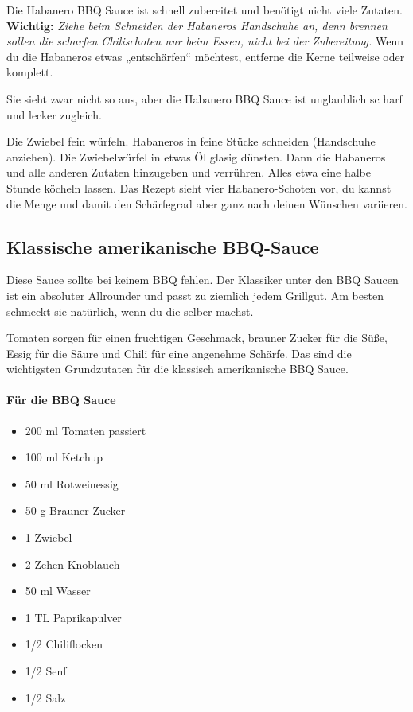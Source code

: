 Die Habanero BBQ Sauce ist schnell zubereitet und benötigt nicht viele Zutaten.
\textbf{Wichtig:} \emph{Ziehe beim Schneiden der Habaneros Handschuhe an, 
	denn brennen sollen die 
	scharfen Chilischoten nur beim Essen, nicht bei der Zubereitung.} Wenn du 
	die Habaneros etwas 
„entschärfen“ möchtest, entferne die Kerne teilweise oder komplett.

Sie sieht zwar nicht so aus, aber die Habanero BBQ Sauce ist unglaublich sc
harf und lecker zugleich.

Die Zwiebel fein würfeln. Habaneros in feine Stücke schneiden (Handschuhe 
anziehen).
Die Zwiebelwürfel in etwas Öl glasig dünsten. Dann die Habaneros und alle 
anderen Zutaten 
hinzugeben und verrühren.
Alles etwa eine halbe Stunde köcheln lassen.
Das Rezept sieht vier Habanero-Schoten vor, du kannst die Menge und damit 
den Schärfegrad aber 
ganz nach deinen Wünschen variieren.

\subsection{Klassische amerikanische BBQ-Sauce}
Diese Sauce sollte bei keinem BBQ fehlen. Der Klassiker unter den BBQ Saucen 
ist ein absoluter Allrounder und passt zu ziemlich jedem Grillgut.
Am besten schmeckt sie natürlich, wenn du die selber machst.

Tomaten sorgen für einen fruchtigen Geschmack, brauner Zucker für die Süße, 
Essig für die Säure und Chili für eine angenehme Schärfe. Das
sind die wichtigsten Grundzutaten für die klassisch amerikanische BBQ Sauce.
\newline

\paragraph{Für die BBQ Sauce}

\begin{itemize}[noitemsep]
	\item 200 ml Tomaten passiert
	\item 100 ml Ketchup
	\item 50 ml Rotweinessig
	\item 50 g Brauner Zucker
	\item 1 Zwiebel
	\item 2 Zehen Knoblauch
	\item 50 ml Wasser
	\item 1 TL Paprikapulver
	\item 1/2 Chiliflocken
	\item 1/2 Senf
	\item 1/2 Salz
\end{itemize}

